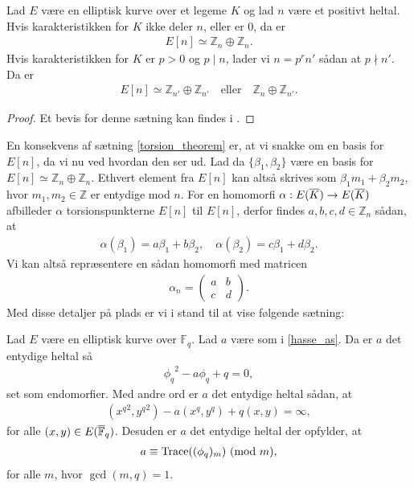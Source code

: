 \begin{thm}
\label{torsion_theorem}
Lad $E$ være en elliptisk kurve over et legeme $K$ og lad $n$ være et positivt heltal. Hvis karakteristikken for $K$ ikke deler $n$, eller er $0$, da er
\begin{align*}
	E[n] \simeq \mathbb{Z}_n \oplus \mathbb{Z}_n.
\end{align*}
Hvis karakteristikken for $K$ er $p > 0$ og $p \mid n$, lader vi $n=p^r n'$ sådan at $p \nmid n'$. Da er
\begin{align*}
	E[n] \simeq \mathbb{Z}_{n'} \oplus \mathbb{Z}_{n'} \quad \text{eller} \quad \mathbb{Z}_n 
	\oplus \mathbb{Z}_{n'}.
\end{align*}
\end{thm}
\begin{proof}
Et bevis for denne sætning kan findes i \cite[s.~79]{Washington}.
\end{proof}
En konsekvens af sætning \ref{torsion_theorem} er, at vi snakke om en basis for $E[n]$, da vi nu ved hvordan den ser ud. Lad da $\{\beta_1, \beta_2\}$ være en basis for $E[n] \simeq \mathbb{Z}_n \oplus \mathbb{Z}_n$. Ethvert element fra $E[n]$ kan altså skrives som $\beta_1 m_1 + \beta_2 m_2$, hvor $m_1, m_2 \in \mathbb{Z}$ er entydige mod $n$. For en homomorfi $\alpha : E(\overline{K}) \to E(\overline{K})$ afbilleder $\alpha$ torsionspunkterne $E[n]$ til $E[n]$, derfor findes $a, b, c, d \in \mathbb{Z}_n$ sådan, at 
\begin{align*}
	\alpha(\beta_1) = a \beta_1 + b \beta_2, \quad \alpha(\beta_2) = c\beta_1 + d \beta_2.
\end{align*}
Vi kan altså repræsentere en sådan homomorfi med matricen
\begin{align*}
	\alpha_n = \left( 
	\begin{matrix}
		a & b \\ 
		c & d 
	\end{matrix} \right).
\end{align*}
Med disse detaljer på plads er vi i stand til at vise følgende sætning:
\begin{thm}
\label{trace_theorem}
Lad $E$ være en elliptisk kurve over $\mathbb{F}_q$. Lad $a$ være som i \eqref{hasse_as}. Da er $a$ det
entydige heltal så
\begin{align*}
	{\phi_q}^2 - a \phi_q + q = 0,
\end{align*}
set som endomorfier. Med andre ord er $a$ det entydige heltal sådan, at 
\begin{align*}
	({x^q}^2, {y^q}^2) - a(x^q, y^q) + q(x, y) = \infty,
\end{align*}
for alle $(x, y) \in E(\overline{\mathbb{F}}_q)$. Desuden er $a$ det entydige heltal der opfylder, at
\begin{align*}
	a \equiv \text{Trace}((\phi_q)_m) \ (\mathrm{mod} \ m),
\end{align*}
for alle $m$, hvor $\gcd(m, q)=1$.
\end{thm}

